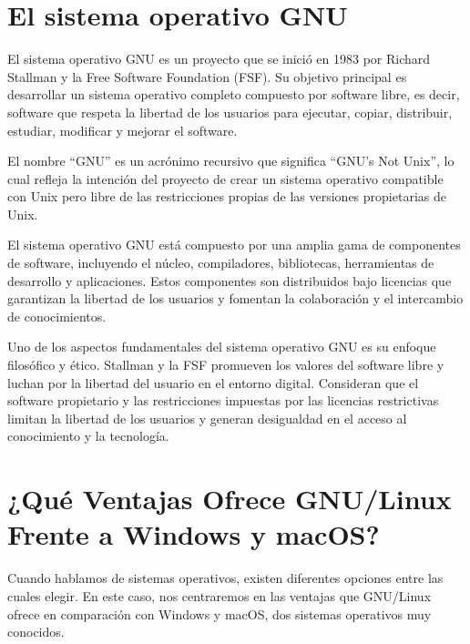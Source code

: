 \documentclass[
  jou,
  floatsintext,
  longtable,
  a4paper,
  nolmodern,
  notxfonts,
  notimes,
  12pt,
  colorlinks=true,linkcolor=blue,citecolor=blue,urlcolor=blue]{apa7}
\begin{document}
\section{El sistema operativo GNU}\label{el-sistema-operativo-gnu}

El sistema operativo GNU es un proyecto que se inició en 1983 por
Richard Stallman y la Free Software Foundation (FSF). Su objetivo
principal es desarrollar un sistema operativo completo compuesto por
software libre, es decir, software que respeta la libertad de los
usuarios para ejecutar, copiar, distribuir, estudiar, modificar y
mejorar el software.

El nombre ``GNU'' es un acrónimo recursivo que significa ``GNU's Not
Unix'', lo cual refleja la intención del proyecto de crear un sistema
operativo compatible con Unix pero libre de las restricciones propias de
las versiones propietarias de Unix.

El sistema operativo GNU está compuesto por una amplia gama de
componentes de software, incluyendo el núcleo, compiladores,
bibliotecas, herramientas de desarrollo y aplicaciones. Estos
componentes son distribuidos bajo licencias que garantizan la libertad
de los usuarios y fomentan la colaboración y el intercambio de
conocimientos.

Uno de los aspectos fundamentales del sistema operativo GNU es su
enfoque filosófico y ético. Stallman y la FSF promueven los valores del
software libre y luchan por la libertad del usuario en el entorno
digital. Consideran que el software propietario y las restricciones
impuestas por las licencias restrictivas limitan la libertad de los
usuarios y generan desigualdad en el acceso al conocimiento y la
tecnología.

\section{¿Qué Ventajas Ofrece GNU/Linux Frente a Windows y
macOS?}\label{quuxe9-ventajas-ofrece-gnulinux-frente-a-windows-y-macos}

Cuando hablamos de sistemas operativos, existen diferentes opciones
entre las cuales elegir. En este caso, nos centraremos en las ventajas
que GNU/Linux ofrece en comparación con Windows y macOS, dos sistemas
operativos muy conocidos.
\end{document}
